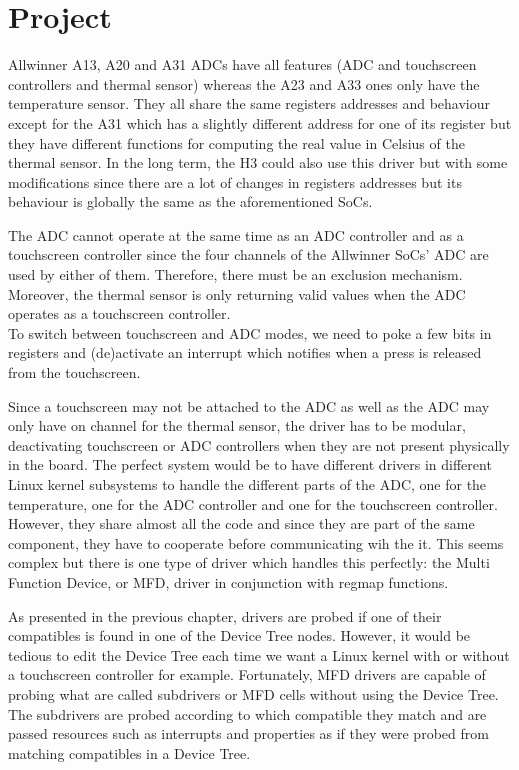 \section{Project}

Allwinner A13, A20 and A31 ADCs have all features (ADC and touchscreen controllers and thermal sensor) whereas the A23 and A33 ones only have the temperature sensor. They all share the same registers addresses and behaviour except for the A31 which has a slightly different address for one of its register but they have different functions for computing the real value in Celsius of the thermal sensor. In the long term, the H3 could also use this driver but with some modifications since there are a lot of changes in registers addresses but its behaviour is globally the same as the aforementioned SoCs.

The ADC cannot operate at the same time as an ADC controller and as a touchscreen controller since the four channels of the Allwinner SoCs' ADC are used by either of them. Therefore, there must be an exclusion mechanism. Moreover, the thermal sensor is only returning valid values when the ADC operates as a touchscreen controller.\\
To switch between touchscreen and ADC modes, we need to poke a few bits in registers and (de)activate an interrupt which notifies when a press is released from the touchscreen.

Since a touchscreen may not be attached to the ADC as well as the ADC may only have on channel for the thermal sensor, the driver has to be modular, deactivating touchscreen or ADC controllers when they are not present physically in the board. The perfect system would be to have different drivers in different Linux kernel subsystems to handle the different parts of the ADC, one for the temperature, one for the ADC controller and one for the touchscreen controller. However, they share almost all the code and since they are part of the same component, they have to cooperate before communicating wih the it. This seems complex but there is one type of driver which handles this perfectly: the Multi Function Device, or MFD, driver in conjunction with regmap functions.

As presented in the previous chapter, drivers are probed if one of their compatibles is found in one of the Device Tree nodes. However, it would be tedious to edit the Device Tree each time we want a Linux kernel with or without a touchscreen controller for example. Fortunately, MFD drivers are capable of probing what are called subdrivers or MFD cells without using the Device Tree. The subdrivers are probed according to which compatible they match and are passed resources such as interrupts and properties as if they were probed from matching compatibles in a Device Tree.

